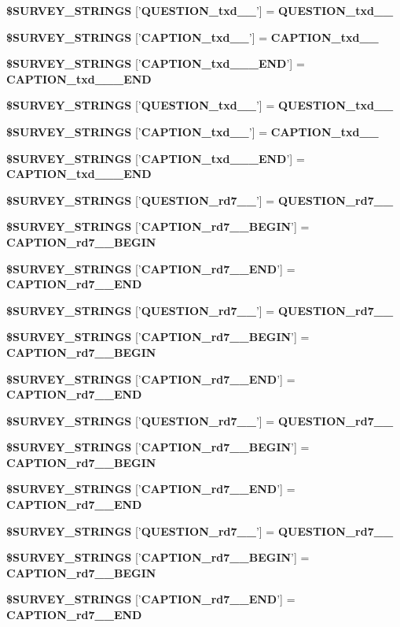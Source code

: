 \begin{CompactItemize}
{\bf \$SURVEY\_\-STRINGS} ['{\bf QUESTION\_\-txd\_\_\-}'] = {\bf QUESTION\_\-txd\_\_\-}
\item 
{\bf \$SURVEY\_\-STRINGS} ['{\bf CAPTION\_\-txd\_\_\-}'] = {\bf CAPTION\_\-txd\_\_\-}
\item 
{\bf \$SURVEY\_\-STRINGS} ['{\bf CAPTION\_\-txd\_\_\-\_\-END}'] = {\bf CAPTION\_\-txd\_\_\-\_\-END}
\item 
{\bf \$SURVEY\_\-STRINGS} ['{\bf QUESTION\_\-txd\_\_\-}'] = {\bf QUESTION\_\-txd\_\_\-}
\item 
{\bf \$SURVEY\_\-STRINGS} ['{\bf CAPTION\_\-txd\_\_\-}'] = {\bf CAPTION\_\-txd\_\_\-}
\item 
{\bf \$SURVEY\_\-STRINGS} ['{\bf CAPTION\_\-txd\_\_\-\_\-END}'] = {\bf CAPTION\_\-txd\_\_\-\_\-END}
\item 
{\bf \$SURVEY\_\-STRINGS} ['{\bf QUESTION\_\-rd7\_\_\-}'] = {\bf QUESTION\_\-rd7\_\_\-}
\item 
{\bf \$SURVEY\_\-STRINGS} ['{\bf CAPTION\_\-rd7\_\_\-BEGIN}'] = {\bf CAPTION\_\-rd7\_\_\-BEGIN}
\item 
{\bf \$SURVEY\_\-STRINGS} ['{\bf CAPTION\_\-rd7\_\_\-END}'] = {\bf CAPTION\_\-rd7\_\_\-END}
\item 
{\bf \$SURVEY\_\-STRINGS} ['{\bf QUESTION\_\-rd7\_\_\-}'] = {\bf QUESTION\_\-rd7\_\_\-}
\item 
{\bf \$SURVEY\_\-STRINGS} ['{\bf CAPTION\_\-rd7\_\_\-BEGIN}'] = {\bf CAPTION\_\-rd7\_\_\-BEGIN}
\item 
{\bf \$SURVEY\_\-STRINGS} ['{\bf CAPTION\_\-rd7\_\_\-END}'] = {\bf CAPTION\_\-rd7\_\_\-END}
\item 
{\bf \$SURVEY\_\-STRINGS} ['{\bf QUESTION\_\-rd7\_\_\-}'] = {\bf QUESTION\_\-rd7\_\_\-}
\item 
{\bf \$SURVEY\_\-STRINGS} ['{\bf CAPTION\_\-rd7\_\_\-BEGIN}'] = {\bf CAPTION\_\-rd7\_\_\-BEGIN}
\item 
{\bf \$SURVEY\_\-STRINGS} ['{\bf CAPTION\_\-rd7\_\_\-END}'] = {\bf CAPTION\_\-rd7\_\_\-END}
\item 
{\bf \$SURVEY\_\-STRINGS} ['{\bf QUESTION\_\-rd7\_\_\-}'] = {\bf QUESTION\_\-rd7\_\_\-}
\item 
{\bf \$SURVEY\_\-STRINGS} ['{\bf CAPTION\_\-rd7\_\_\-BEGIN}'] = {\bf CAPTION\_\-rd7\_\_\-BEGIN}
\item 
{\bf \$SURVEY\_\-STRINGS} ['{\bf CAPTION\_\-rd7\_\_\-END}'] = {\bf CAPTION\_\-rd7\_\_\-END}
\item 

\end{CompactItemize}
